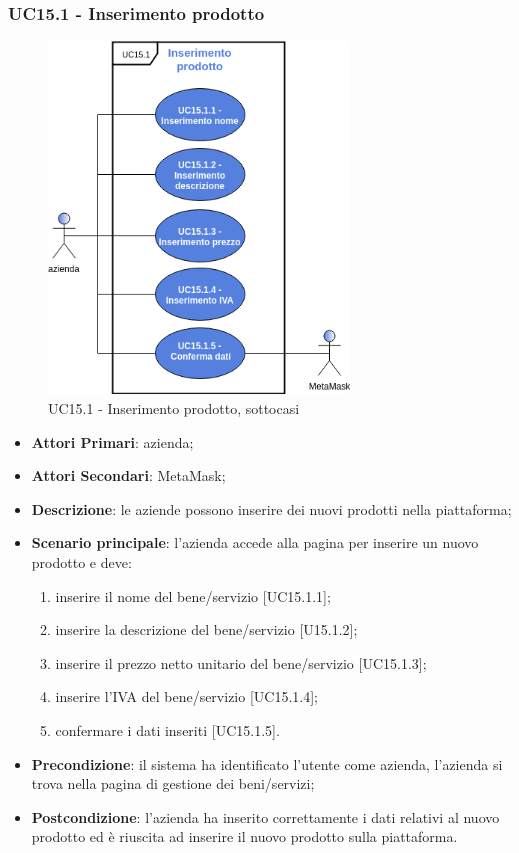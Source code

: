 \subsubsection{UC15.1 - Inserimento prodotto}
\begin{figure}[h]
	\includegraphics[width=8cm]{res/images/UC15-1.png}
	\centering
	\caption{UC15.1 - Inserimento prodotto, sottocasi}
\end{figure}
\begin{itemize}
	\item \textbf{Attori Primari}: azienda;
	\item \textbf{Attori Secondari}: MetaMask\glo;
	\item \textbf{Descrizione}: le aziende possono inserire dei nuovi prodotti nella piattaforma;
	\item \textbf{Scenario principale}: l'azienda accede alla pagina per inserire un nuovo prodotto e deve:
	\begin{enumerate}[label=\alph*.]
			\item inserire il nome del bene/servizio [UC15.1.1];
		\item inserire la descrizione del bene/servizio [U15.1.2];
		\item inserire il prezzo netto unitario del bene/servizio [UC15.1.3];
		\item inserire l'IVA del bene/servizio [UC15.1.4];
		\item confermare i dati inseriti [UC15.1.5].
	\end{enumerate}
	
	\item \textbf{Precondizione}: il sistema ha identificato l'utente come azienda, l'azienda si trova nella pagina di gestione dei beni/servizi;
	\item \textbf{Postcondizione}: l'azienda ha inserito correttamente i dati relativi al nuovo prodotto ed è riuscita ad inserire il nuovo prodotto sulla piattaforma.	
\end{itemize}
